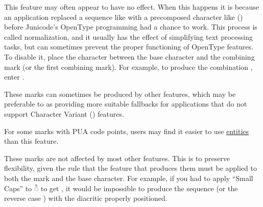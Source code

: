 This feature may often appear to have no effect. When this happens it is because
an application replaced a sequence like  with a precomposed character
like  () before Junicode's OpenType programming had a chance to work.
This process is called normalization, and it usually has the effect of simplifying
text processing tasks, but can sometimes prevent the proper functioning of OpenType
features. To disable it, place the character   between the base
character and the combining mark (or the first combining mark). For example, to produce
the combination , enter .

These marks can sometimes be produced by other  features, which may be preferable to
 as providing more suitable fallbacks for applications that do not support Character Variant
() features.

For some marks with PUA code points, users may find it easier to use \hyperlink{ss10}{entities} than this feature.

These marks are not affected by most other features. This is to preserve flexibility, given the rule that the feature
that produces them must be applied to both the mark and the base character. For example, if you had to
apply  “Small Caps” to  ◌͏ᷨ to get
 , it would be impossible to produce the sequence
(or the reverse case )
with the diacritic properly positioned.

